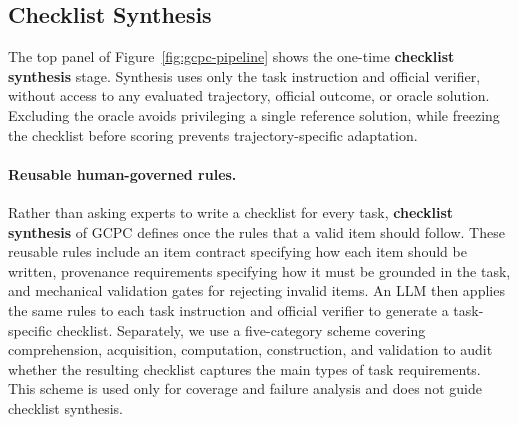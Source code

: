 \documentclass[sigconf,nonacm]{acmart}
\begin{document}
\subsection{Checklist Synthesis}
\label{sec:synthesis}

The top panel of Figure~\ref{fig:gcpc-pipeline} shows the one-time \textbf{checklist synthesis} stage. Synthesis uses only the task instruction and official verifier, without access to any evaluated trajectory, official outcome, or oracle solution. Excluding the oracle avoids privileging a single reference solution, while freezing the checklist before scoring prevents trajectory-specific adaptation.

\paragraph{Reusable human-governed rules.}
Rather than asking experts to write a checklist for every task,  \textbf{checklist synthesis} of GCPC defines once the rules that a valid item should follow. These reusable rules include an item contract specifying how each item should be written, provenance requirements specifying how it must be grounded in the task, and mechanical validation gates for rejecting invalid items. An LLM then applies the same rules to each task instruction and official verifier to generate a task-specific checklist. Separately, we use a five-category scheme covering comprehension, acquisition, computation, construction, and validation to audit whether the resulting checklist captures the main types of task requirements. This scheme is used only for coverage and failure analysis and does not guide checklist synthesis.
\end{document}
